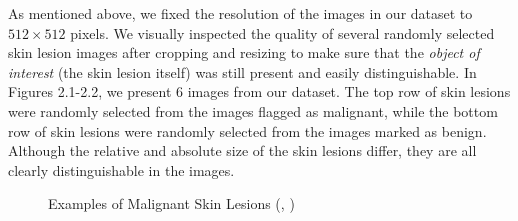 \documentclass [MAS] {uclathes}
\begin{document}
As mentioned above, we fixed the resolution of the images in our dataset to $512 \times 512$ pixels. We visually inspected the quality of several randomly selected skin lesion images after cropping and resizing to make sure that the \textit{object of interest} (the skin lesion itself) was still present and easily distinguishable. In Figures 2.1-2.2, we present 6 images from our dataset. The top row of skin lesions were randomly selected from the images flagged as malignant, while the bottom row of skin lesions were randomly selected from the images marked as benign. Although the relative and absolute size of the skin lesions differ, they are all clearly distinguishable in the images. 

\begin{figure}[hbt!]
\hspace*{\fill}
\centering
{}\hspace{0.5em}
\hspace{0.5em}
\hspace*{\fill}
\label{fig:mel_examples}
\vspace{-1cm}
\caption{Examples of Malignant Skin Lesions (\cite{ISIC}, \cite{ISIC2})}
\end{figure}
\end{document}
